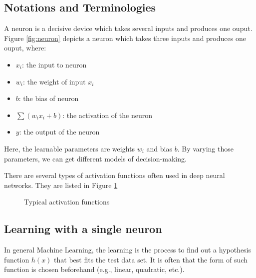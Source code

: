 \subsection{Notations and Terminologies}

A neuron is a decisive device which takes several inputs and produces one ouput. Figure \ref{fig:neuron} depicts a neuron which takes three inputs and produces one ouput, where:
\begin{itemize}[noitemsep]
	\item $x_i$: the input to neuron
	\item $w_i$: the weight of input $x_i$
	\item $b$: the bias of neuron
	\item $\sum\left(w_ix_i + b\right)$: the activation of the neuron
	\item $y$: the output of the neuron
\end{itemize}

Here, the learnable parameters are weights $w_i$ and bias $b$. By varying those parameters, we can get different models of decision-making.

There are several types of activation functions often used in deep neural networks. They are listed in Figure \ref{fig:activation-function}
\begin{figure}[h]
	\centering
	\qquad
	\qquad
	\caption{Typical activation functions}
	\label{fig:activation-function}
\end{figure}

\subsection{Learning with a single neuron}
In general Machine Learning, the learning is the process to find out a hypothesis function $h\left(x\right)$ that best fits the test data set. It is often that the form of such function is chosen beforehand (e.g., linear, quadratic, etc.). 

